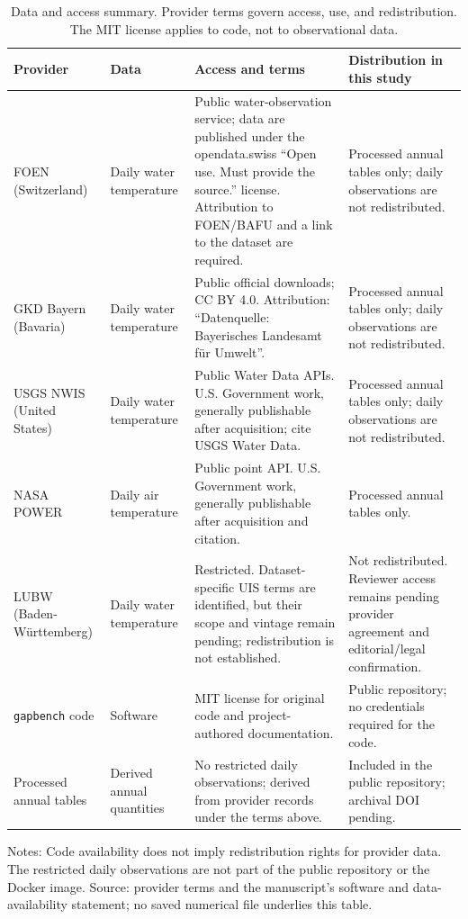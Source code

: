 \begin{table}[p]
\centering
\footnotesize
\caption{Data and access summary. Provider terms govern access, use, and redistribution. The MIT license applies to code, not to observational data.}
\label{tab:S11}
\setlength{\tabcolsep}{4pt}
\begin{tabular}{>{\raggedright\arraybackslash}p{}>{\raggedright\arraybackslash}p{}>{\raggedright\arraybackslash}p{}>{\raggedright\arraybackslash}p{}}
\toprule
Provider & Data & Access and terms & Distribution in this study \\
\midrule
FOEN (Switzerland) & Daily water temperature & Public water-observation service; data are published under the opendata.swiss ``Open use. Must provide the source.'' license. Attribution to FOEN/BAFU and a link to the dataset are required. & Processed annual tables only; daily observations are not redistributed. \\
GKD Bayern (Bavaria) & Daily water temperature & Public official downloads; CC BY 4.0. Attribution: ``Datenquelle: Bayerisches Landesamt f\"ur Umwelt''. & Processed annual tables only; daily observations are not redistributed. \\
USGS NWIS (United States) & Daily water temperature & Public Water Data APIs. U.S. Government work, generally publishable after acquisition; cite USGS Water Data. & Processed annual tables only; daily observations are not redistributed. \\
NASA POWER & Daily air temperature & Public point API. U.S. Government work, generally publishable after acquisition and citation. & Processed annual tables only. \\
LUBW (Baden-W\"urttem\-berg) & Daily water temperature & Restricted. Dataset-specific UIS terms are identified, but their scope and vintage remain pending; redistribution is not established. & Not redistributed. Reviewer access remains pending provider agreement and editorial/legal confirmation. \\
\texttt{gapbench} code & Software & MIT license for original code and project-authored documentation. & Public repository; no credentials required for the code. \\
Processed annual tables & Derived annual quantities & No restricted daily observations; derived from provider records under the terms above. & Included in the public repository; archival DOI pending. \\
\bottomrule
\end{tabular}
\par\smallskip\footnotesize Notes: Code availability does not imply redistribution rights for provider data. The restricted daily observations are not part of the public repository or the Docker image. Source: provider terms and the manuscript's software and data-availability statement; no saved numerical file underlies this table.
\end{table}
